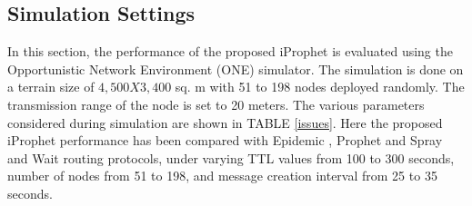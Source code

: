\documentclass[10pt,journal]{IEEEtran}
\begin{document}
\subsection{Simulation Settings}
In this section, the performance of the proposed iProphet is evaluated using the Opportunistic Network Environment (ONE) \cite{keranen2008opportunistic} simulator. The simulation is done on a terrain size of  \(4,500 X 3,400 \) sq. m with 51 to 198 nodes deployed randomly. The transmission range of the node is set to 20 meters. The various parameters considered during simulation are shown in TABLE \ref{issues}. Here the proposed iProphet performance has been compared with Epidemic \cite{2000epi}, Prophet \cite{2003pric} and Spray and Wait  \cite{spyropoulos2005spray} routing protocols, under varying TTL values from 100 to 300 seconds, number of nodes from 51 to 198, and message creation interval from 25 to 35 seconds.
\end{document}
